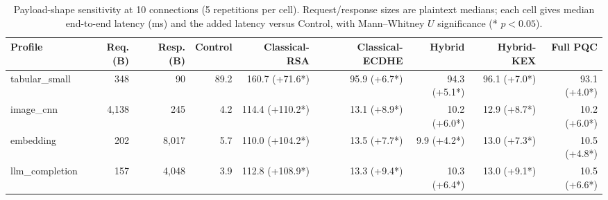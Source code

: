 \begin{table}[t]
\centering
\caption{Payload-shape sensitivity at 10 connections (5 repetitions per cell). Request/response sizes are plaintext medians; each cell gives median end-to-end latency (ms) and the added latency versus Control, with Mann--Whitney $U$ significance (* $p<0.05$).}
\label{tab:payload}
\setlength{\tabcolsep}{4pt}
\begin{tabular}{@{}lrrrrrrrr@{}}
\toprule
Profile & Req. (B) & Resp. (B) & Control & Classical-RSA & Classical-ECDHE & Hybrid & Hybrid-KEX & Full PQC \\
\midrule
tabular\_small & 348 & 90 & 89.2 & 160.7 (+71.6*) & 95.9 (+6.7*) & 94.3 (+5.1*) & 96.1 (+7.0*) & 93.1 (+4.0*) \\
image\_cnn & 4,138 & 245 & 4.2 & 114.4 (+110.2*) & 13.1 (+8.9*) & 10.2 (+6.0*) & 12.9 (+8.7*) & 10.2 (+6.0*) \\
embedding & 202 & 8,017 & 5.7 & 110.0 (+104.2*) & 13.5 (+7.7*) & 9.9 (+4.2*) & 13.0 (+7.3*) & 10.5 (+4.8*) \\
llm\_completion & 157 & 4,048 & 3.9 & 112.8 (+108.9*) & 13.3 (+9.4*) & 10.3 (+6.4*) & 13.0 (+9.1*) & 10.5 (+6.6*) \\
\bottomrule
\end{tabular}
\end{table}
